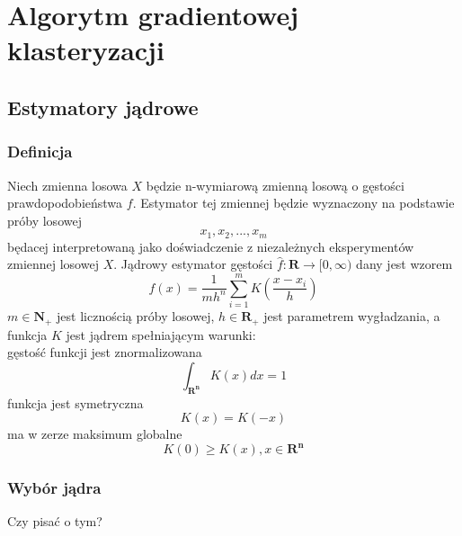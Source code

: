 \chapter{Algorytm gradientowej klasteryzacji}
\label{cha:gradient_clustering_algorithm}

\section{Estymatory jądrowe}
\label{sec:estymatory}
\subsection{Definicja}

Niech zmienna losowa $X$ będzie n-wymiarową zmienną losową o gęstości prawdopodobieństwa $f$. Estymator tej zmiennej będzie wyznaczony na podstawie próby losowej
\begin{equation}
x_1, x_2, ..., x_m
\end{equation}
będacej interpretowaną jako doświadczenie z niezależnych eksperymentów zmiennej losowej $X$.
Jądrowy estymator gęstości $\hat{f}: \mathbf{R} \to [0, \infty)$ dany jest wzorem
\begin{equation}
\label{eq:estymator}
\hat{f}(x)=\frac{1}{mh^n} \displaystyle \sum_{i=1}^{m}K(\frac{x-x_i}{h})
\end{equation}
$m \in \mathbf{N_+}$ jest licznością próby losowej, $h \in \mathbf{R_+}$ jest parametrem wygładzania, a funkcja $K$ jest jądrem spełniającym warunki: \\
gęstość funkcji jest znormalizowana
\begin{equation}
\int_{\mathbf{R^n}} K(x)dx = 1
\end{equation}
funkcja jest symetryczna
\begin{equation}
K(x) = K(-x)
\end{equation}
ma w zerze maksimum globalne
\begin{equation}
K(0) \geq K(x), x \in \mathbf{R^n}
\end{equation}

\subsection{Wybór jądra}
Czy pisać o tym?

